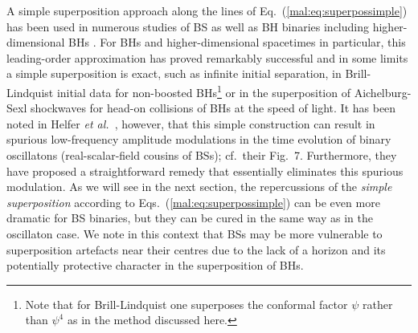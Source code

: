A simple superposition approach along the lines
of Eq.~(\ref{mal:eq:superpossimple}) has been used in
numerous studies of BS as well as BH binaries
including higher-dimensional BHs
\cite{Palenzuela:2006wp,Palenzuela:2007dm,Shibata:2008rq,Okawa:2011fv,Palenzuela:2017kcg,Sperhake:2019oaw}. For BHs and higher-dimensional
spacetimes in particular, this leading-order approximation
has proved remarkably successful and in some limits
a simple superposition is
exact, such as infinite initial separation,
in Brill-Lindquist initial data for non-boosted BHs\footnote{Note that for Brill-Lindquist one superposes the conformal
factor $\psi$ rather than $\psi^4$ as in the
method discussed here.}
\cite{Brill:1963yv}
or in the superposition of
Aichelburg-Sexl shockwaves \cite{Aichelburg:1970dh}
for head-on collisions of BHs at the speed of light.
It has been noted in Helfer {\em et al.}~\cite{Helfer:2018vtq}, however,
that this simple
construction can result in spurious low-frequency
amplitude modulations in the
time evolution of binary oscillatons (real-scalar-field cousins of BSs); cf.~their Fig.~7. Furthermore, they have proposed a
straightforward remedy that essentially eliminates this spurious
modulation. As we will see in the next section, the repercussions
of the {\it simple superposition} according to Eqs.~(\ref{mal:eq:superpossimple})
can be even more dramatic for BS binaries, but they can
be cured in the same way as in the oscillaton case.
We note in this context that BSs may be more vulnerable
to superposition artefacts near their centres
due to the lack of a horizon and
its potentially protective character in the superposition of
BHs.

